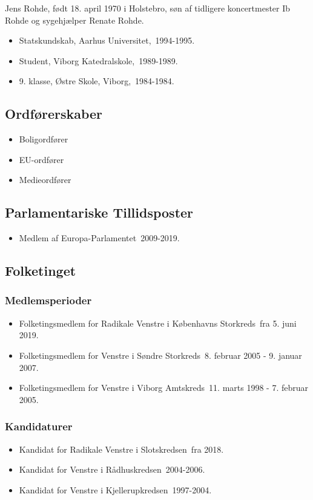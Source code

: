 \documentclass[11pt, a4paper]{awesome-cv}
\begin{document}
\makecvheader[R]
\makelettertitle
\begin{cvletter}
Jens Rohde, født 18. april 1970 i Holstebro, søn af tidligere koncertmester Ib Rohde og sygehjælper Renate Rohde.

\begin{itemize}
\item Statskundskab, Aarhus Universitet, 1994-1995.
\item Student, Viborg Katedralskole, 1989-1989.
\item 9. klasse, Østre Skole, Viborg, 1984-1984.
\end{itemize}
\subsection*{Ordførerskaber}
\begin{itemize}
\item Boligordfører
\item EU-ordfører
\item Medieordfører
\end{itemize}
\subsection*{Parlamentariske Tillidsposter}
\begin{itemize}
\item Medlem af Europa-Parlamentet 2009-2019.
\end{itemize}
\subsection*{Folketinget}
\subsubsection*{Medlemsperioder}
\begin{itemize}
\item Folketingsmedlem for Radikale Venstre i Københavns Storkreds fra 5. juni 2019.
\item Folketingsmedlem for Venstre i Søndre Storkreds 8. februar 2005 - 9. januar 2007.
\item Folketingsmedlem for Venstre i Viborg Amtskreds 11. marts 1998 - 7. februar 2005.
\end{itemize}
\subsubsection*{Kandidaturer}
\begin{itemize}
\item Kandidat for Radikale Venstre i Slotskredsen fra 2018.
\item Kandidat for Venstre i Rådhuskredsen 2004-2006.
\item Kandidat for Venstre i Kjellerupkredsen 1997-2004.
\end{itemize}

\end{cvletter}
\end{document}
